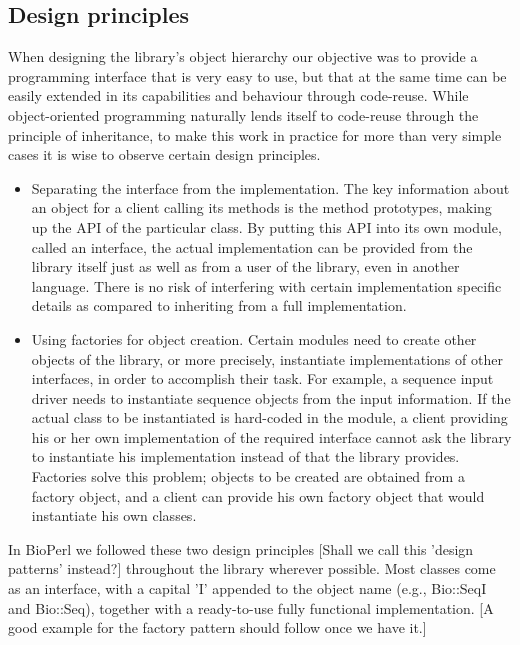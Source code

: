 \documentclass{article}
\begin{document}
\begin{twocolumn}
\subsection{Design principles}

When designing the library's object hierarchy our objective was to
provide a programming interface that is very easy to use, but that at
the same time can be easily extended in its capabilities and behaviour
through code-reuse.  While object-oriented programming naturally lends
itself to code-reuse through the principle of inheritance, to make
this work in practice for more than very simple cases it is wise to
observe certain design principles. 

\begin{itemize}

\item Separating the interface from the implementation.  The key
information about an object for a client calling its methods is the
method prototypes, making up the API of the particular class.  By
putting this API into its own module, called an interface, the actual
implementation can be provided from the library itself just as well as
from a user of the library, even in another language.  There is no risk
of interfering with certain implementation specific details as
compared to inheriting from a full implementation.


\item Using factories for object creation.  Certain modules need to
create other objects of the library, or more precisely, instantiate
implementations of other interfaces, in order to accomplish their
task.  For example, a sequence input driver needs to instantiate
sequence objects from the input information.  If the actual class to be
instantiated is hard-coded in the module, a client providing his or
her own implementation of the required interface cannot ask the
library to instantiate his implementation instead of that the library
provides.  Factories solve this problem; objects to be created are
obtained from a factory object, and a client can provide his own
factory object that would instantiate his own classes.

\end{itemize}

In BioPerl we followed these two design principles [Shall we call this
'design patterns' instead?] throughout the library wherever
possible.  Most classes come as an interface, with a capital 'I'
appended to the object name (e.g., Bio::SeqI and Bio::Seq), together
with a ready-to-use fully functional implementation.  [A good example
for the factory pattern should follow once we have it.]


\end{twocolumn}
\end{document}
